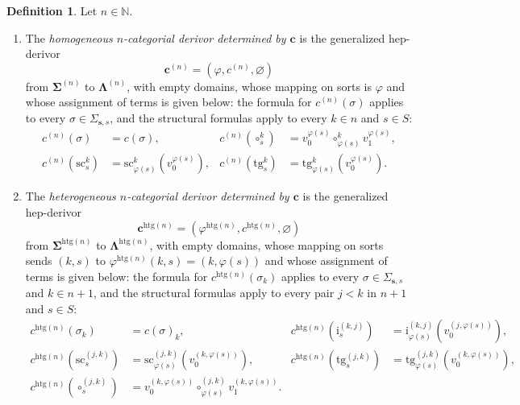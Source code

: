 \documentclass[a4paper, reqno]{amsbook}
\newcommand{\sig}[1]{\mathbf{#1}}             %
\newcommand{\htg}{\mathrm{htg}}                %
\newcommand{\src}{\mathrm{sc}}
\newcommand{\tgt}{\mathrm{tg}}
\theoremstyle{plain}
\theoremstyle{definition}
\newtheorem{definition}[theorem]{Definition}
\begin{document}
\begin{definition}\label{DChangeSigDerivor}
Let $n\in\mathbb{N}$.
\begin{enumerate}
\item The \emph{homogeneous $n$-categorial derivor determined by $\mathbf{c}$} is the generalized hep-derivor
$$
\mathbf{c}^{(n)}=\left(\varphi,c^{(n)},\varnothing\right)
$$
from $\sig{\Sigma}^{(n)}$ to $\sig{\Lambda}^{(n)}$, with empty domains, whose mapping on sorts is $\varphi$ and whose assignment of terms is given below: the formula for $c^{(n)}(\sigma)$ applies to every $\sigma\in\Sigma_{\mathbf{s},s}$, and the structural formulas apply to every $k\in n$ and $s\in S$:
\begin{align*}
c^{(n)}(\sigma)&=c(\sigma), &
c^{(n)}(\circ^{k}_{s})&=v^{\varphi(s)}_{0}\circ^{k}_{\varphi(s)}v^{\varphi(s)}_{1},\\
c^{(n)}(\src^{k}_{s})&=\src^{k}_{\varphi(s)}\left(v^{\varphi(s)}_{0}\right), &
c^{(n)}(\tgt^{k}_{s})&=\tgt^{k}_{\varphi(s)}\left(v^{\varphi(s)}_{0}\right).
\end{align*}
\item The \emph{heterogeneous $n$-categorial derivor determined by $\mathbf{c}$} is the generalized hep-derivor
$$
\mathbf{c}^{\htg(n)}=\left(\varphi^{\htg(n)},c^{\htg(n)},\varnothing\right)
$$
from $\sig{\Sigma}^{\htg(n)}$ to $\sig{\Lambda}^{\htg(n)}$, with empty domains, whose mapping on sorts sends $(k,s)$ to $\varphi^{\htg(n)}(k,s)=(k,\varphi(s))$ and whose assignment of terms is given below: the formula for $c^{\htg(n)}(\sigma_k)$ applies to every $\sigma\in\Sigma_{\mathbf{s},s}$ and $k\in n+1$, and the structural formulas apply to every pair $j<k$ in $n+1$ and $s\in S$:
\begin{align*}
c^{\htg(n)}(\sigma_{k})&=c(\sigma)_{k}, &
c^{\htg(n)}(\mathrm{i}^{(k,j)}_{s})&=\mathrm{i}^{(k,j)}_{\varphi(s)}\left(v^{(j,\varphi(s))}_{0}\right),\\
c^{\htg(n)}(\src^{(j,k)}_{s})&=\src^{(j,k)}_{\varphi(s)}\left(v^{(k,\varphi(s))}_{0}\right), &
c^{\htg(n)}(\tgt^{(j,k)}_{s})&=\tgt^{(j,k)}_{\varphi(s)}\left(v^{(k,\varphi(s))}_{0}\right),\\
c^{\htg(n)}(\circ^{(j,k)}_{s})&=v^{(k,\varphi(s))}_{0}\circ^{(j,k)}_{\varphi(s)}v^{(k,\varphi(s))}_{1}.
\end{align*}
\end{enumerate}
\end{definition}
\end{document}
